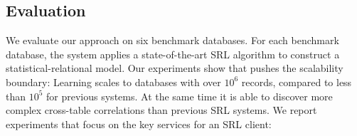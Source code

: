 %

\subsection{Evaluation} We evaluate our approach on six benchmark databases. For each benchmark database, the system applies a state-of-the-art SRL algorithm to construct a statistical-relational model.
Our experiments show that \FB pushes the scalability boundary: Learning scales to databases with over $10^6$ records, compared to less than $10^5$ for previous systems. At the same time it is able to discover more complex cross-table correlations than previous SRL systems. We report experiments that focus on the key services for an SRL client: 

